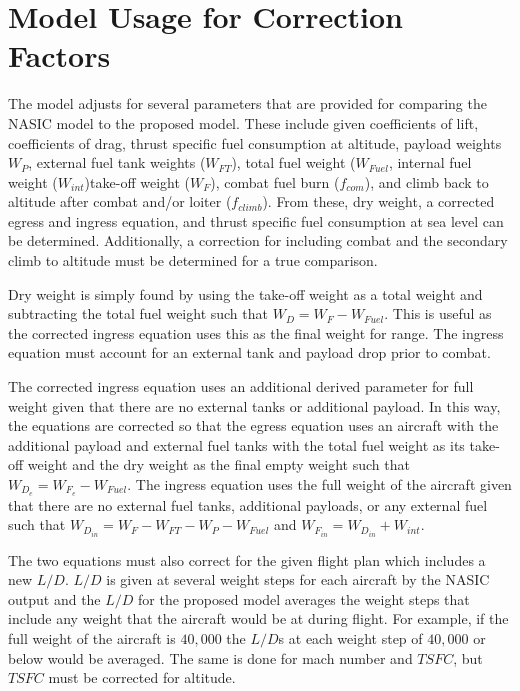 \section{Model Usage for Correction Factors}
\label{section:modelUsage}
The model adjusts for several parameters that are provided for comparing the NASIC model to the proposed model. These include given coefficients of lift, coefficients of drag, thrust specific fuel consumption at altitude, payload weights $W_P$, external fuel tank weights ($W_{FT}$), total fuel weight ($W_{Fuel}$, internal fuel weight ($W_{int}$)take-off weight ($W_F$), combat fuel burn ($f_{com}$), and climb back to altitude after combat and/or loiter ($f_{climb}$). From these, dry weight, a corrected egress and ingress equation, and thrust specific fuel consumption at sea level can be determined. Additionally, a correction for including combat and the secondary climb to altitude must be determined for a true comparison.\par
Dry weight is simply found by using the take-off weight as a total weight and subtracting the total fuel weight such that $W_D = W_F - W_{Fuel}$. This is useful as the corrected ingress equation uses this as the final weight for range. The ingress equation must account for an external tank and payload drop prior to combat.\par
The corrected ingress equation uses an additional derived parameter for full weight given that there are no external tanks or additional payload. In this way, the equations are corrected so that the egress equation uses an aircraft with the additional payload and external fuel tanks with the total fuel weight as its take-off weight and the dry weight as the final empty weight such that $W_{D_e} = W_{F_e}-W_{Fuel}$. The ingress equation uses the full weight of the aircraft given that there are no external fuel tanks, additional payloads, or any external fuel such that $W_{D_{in}} = W_F-W_{FT}-W_P - W_{Fuel}$ and $W_{F_{in}} = W_{D_{in}} + W_{int}$. \par
The two equations must also correct for the given flight plan which includes a new $L/D$. $L/D$ is given at several weight steps for each aircraft by the NASIC output and the $L/D$ for the proposed model averages the weight steps that include any weight that the aircraft would be at during flight. For example, if the full weight of the aircraft is $40,000$ the $L/D$s at each weight step of $40,000$ or below would be averaged. The same is done for mach number and $TSFC$, but $TSFC$ must be corrected for altitude.\par
